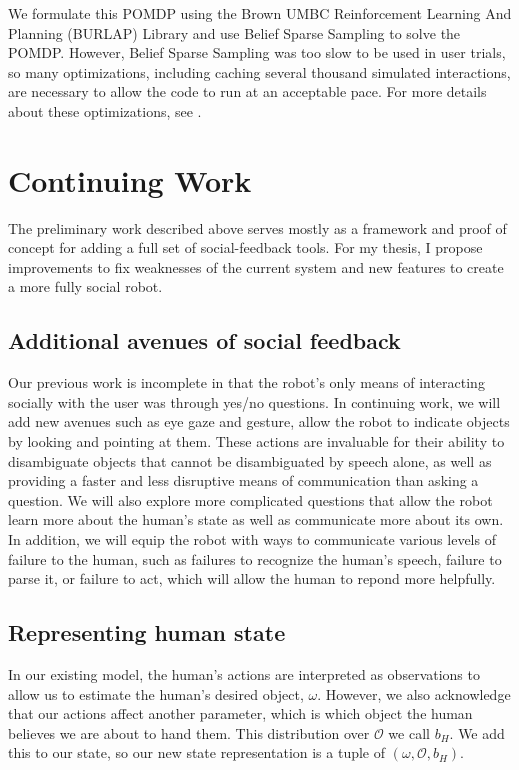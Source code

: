 \documentclass{article}
\begin{document}
We formulate this POMDP using the Brown UMBC Reinforcement Learning And Planning (BURLAP) Library \citep{burlap} and use Belief Sparse Sampling \citep{bss} to solve the POMDP. However, Belief Sparse Sampling was too slow to be used in user trials, so many optimizations, including caching several thousand simulated interactions, are necessary to allow the code to run at an acceptable pace. For more details about these optimizations, see \citet{socialfeedback}. 


\section{Continuing Work}


The preliminary work described above serves mostly as a framework and proof of concept for adding a full set of social-feedback tools. For my thesis, I propose improvements to fix weaknesses of the current system and new features to create a more fully social robot.  

\subsection{Additional avenues of social feedback}

Our previous work is incomplete in that the robot's only means of interacting socially with the user was through yes/no questions. In continuing work, we will add new avenues such as eye gaze and gesture, allow the robot to indicate objects by looking and pointing at them. These actions are invaluable for their ability to disambiguate objects that cannot be disambiguated by speech alone, as well as providing a faster and less disruptive means of communication than asking a question. We will also explore more complicated questions that allow the robot learn more about the human's state as well as communicate more about its own. In addition, we will equip the robot with ways to communicate various levels of failure to the human, such as failures to recognize the human's speech, failure to parse it, or failure to act, which will allow the human to repond more helpfully. 

\subsection{Representing human state}

In our existing model, the human's actions are interpreted as observations to allow us to estimate the human's desired object, $\omega$. However, we also acknowledge that our actions affect another parameter, which is which object the human believes we are about to hand them. This distribution over $\mathcal{O}$ we call $b_H$. We add this to our state, so our new state representation is a tuple of $(\omega, \mathcal{O}, b_H)$. 
\end{document}
